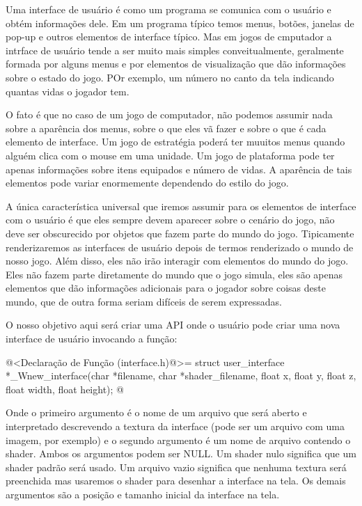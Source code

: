 
Uma interface de usuário é como um programa se comunica com o usuário
e obtém informações dele. Em um programa típico temos menus, botões,
janelas de pop-up e outros elementos de interface típico. Mas em jogos
de cmputador a intrface de usuário tende a ser muito mais simples
conveitualmente, geralmente formada por alguns menus e por elementos
de visualização que dão informações sobre o estado do jogo. POr
exemplo, um número no canto da tela indicando quantas vidas o jogador
tem.

O fato é que no caso de um jogo de computador, não podemos assumir
nada sobre a aparência dos menus, sobre o que eles vã fazer e sobre o
que é cada elemento de interface. Um jogo de estratégia poderá ter
muuitos menus quando alguém clica com o mouse em uma unidade. Um jogo
de plataforma pode ter apenas informações sobre itens equipados e
número de vidas. A aparência de tais elementos pode variar enormemente
dependendo do estilo do jogo.

A única característica universal que iremos assumir para os elementos
de interface com o usuário é que eles sempre devem aparecer sobre o
cenário do jogo, não deve ser obscurecido por objetos que fazem parte
do mundo do jogo. Tipicamente renderizaremos as interfaces de usuário
depois de termos renderizado o mundo de nosso jogo. Além disso, eles
não irão interagir com elementos do mundo do jogo. Eles não fazem
parte diretamente do mundo que o jogo simula, eles são apenas
elementos que dão informações adicionais para o jogador sobre coisas
deste mundo, que de outra forma seriam difíceis de serem expressadas.

O nosso objetivo aqui será criar uma API onde o usuário pode criar uma
nova interface de usuário invocando a função:

\iniciocodigo
@<Declaração de Função (interface.h)@>=
struct user_interface *_Wnew_interface(char *filename, char *shader_filename,
                                      float x, float y, float z, float width,
                                      float height);
@
\fimcodigo

Onde o primeiro argumento é o nome de um arquivo que será aberto e
interpretado descrevendo a textura da interface (pode ser um arquivo
com uma imagem, por exemplo) e o segundo argumento é um nome de
arquivo contendo o shader. Ambos os argumentos podem ser NULL. Um
shader nulo significa que um shader padrão será usado. Um arquivo
vazio significa que nenhuma textura será preenchida mas usaremos o
shader para desenhar a interface na tela. Os demais argumentos são a
posição e tamanho inicial da interface na tela.

